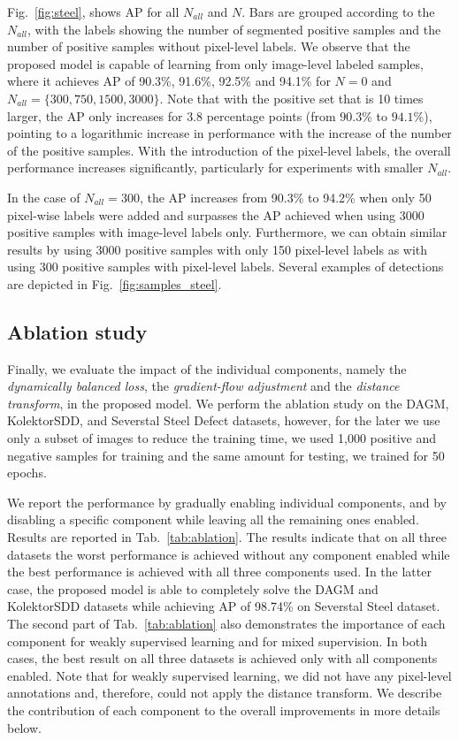 Fig.~\ref{fig:steel}, shows AP for all $N_{all}$ and $N$.
Bars are grouped according to the $N_{all}$, with the labels showing the number of segmented positive samples and the number of positive samples without pixel-level labels.
We observe that the proposed model is capable of learning from only image-level labeled samples, where it achieves AP of 90.3\%, 91.6\%, 92.5\% and 94.1\% for $N=0$ and $N_{all}=\{300, 750, 1500, 3000\}$.
Note that with the positive set that is 10 times larger, the AP only increases for $3.8$ percentage points (from $90.3$\% to $94.1\%$), pointing to a logarithmic increase in performance with the increase of the number of the positive samples. 
With the introduction of the pixel-level labels, the overall performance increases significantly, particularly for experiments with smaller $N_{all}$.

In the case of $N_{all}=300$, the AP increases from 90.3\% to 94.2\% when only 50 pixel-wise labels were added and surpasses the AP achieved when using 3000 positive samples with image-level labels only. 
Furthermore, we can obtain similar results by using 3000 positive samples with only 150 pixel-level labels as with using 300 positive samples with pixel-level labels. Several examples of detections are depicted in Fig.~\ref{fig:samples_steel}.

\subsection{Ablation study} 

Finally, we evaluate the impact of the individual components, namely the \textit{dynamically balanced loss}, the \textit{gradient-flow adjustment} and the \textit{distance transform}, in the proposed model. We perform the ablation study on the DAGM, KolektorSDD, and Severstal Steel Defect datasets, however, for the later we use only a subset of images to reduce the training time, we used 1,000 positive and negative samples for training and the same amount for testing, we trained for 50 epochs.

We report the performance by gradually enabling individual components, and by disabling a specific component while leaving all the remaining ones enabled. Results are reported in Tab.~\ref{tab:ablation}. The results indicate that on all three datasets the worst performance is achieved without any component enabled while the best performance is achieved with all three components used. In the latter case, the proposed model is able to completely solve the DAGM and KolektorSDD datasets while achieving AP of 98.74\% on Severstal Steel dataset. The second part of Tab.~\ref{tab:ablation} also demonstrates the importance of each component for weakly supervised learning and for mixed supervision. In both cases, the best result on all three datasets is achieved only with all components enabled. Note that for weakly supervised learning, we did not have any pixel-level annotations and, therefore, could not apply the distance transform. We describe the contribution of each component to the overall improvements in more details below.

